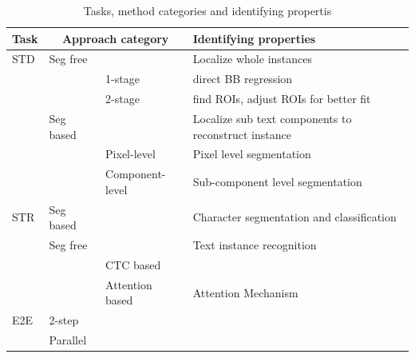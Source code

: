 \begin{table}[ht]
    \centering\scriptsize
    \begin{tabular}{p{}p{}p{}p{}}
        Task & \multicolumn{2}{c}{Approach category} & Identifying properties \\
        \toprule
        STD & Seg free & & Localize whole instances  \\
            & & 1-stage & direct \ac{BB} regression \\
            & & 2-stage & find \acp{ROI}, adjust \acp{ROI} for better fit \\
            & Seg based & & Localize sub text components to reconstruct instance \\
            & & Pixel-level & Pixel level segmentation \\
            & & Component-level & Sub-component level segmentation \\
        \midrule
        STR & Seg based & & Character segmentation and classification\\
            & Seg free & & Text instance recognition \\
            & & CTC based &  \\
            & & Attention based & Attention Mechanism \\
        \midrule
        E2E & 2-step & & \\
            & Parallel & & \\
        \bottomrule
    \end{tabular}
    \caption{Tasks, method categories and identifying propertis\label{tb:steps-properties}}
\end{table}

